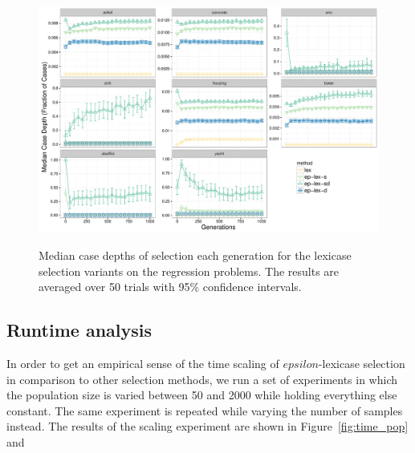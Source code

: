 \documentclass[twoside]{article}
\begin{document}
\begin{figure}
\centering
  \includegraphics[width=\textwidth]{figs/median_case_depth.pdf}\\
 \caption{Median case depths of selection each generation for the lexicase selection variants on the regression problems. The results are averaged over 50 trials with 95\% confidence intervals. }\label{fig:case_depth}
\end{figure}

\label{tbl:tables===}





\subsection{Runtime analysis}
In order to get an empirical sense of the time scaling of $epsilon$-lexicase selection in comparison to other selection methods, we run a set of experiments in which the population size is varied between 50 and 2000 while holding everything else constant. The same experiment is repeated while varying the number of samples instead. The results of the scaling experiment are shown in Figure~\ref{fig:time_pop} and 
\end{document}
